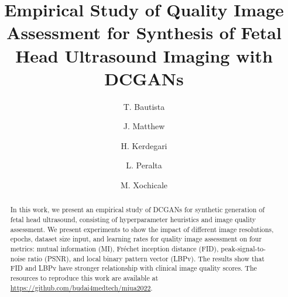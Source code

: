 \documentclass[runningheads]{llncs}
\begin{document}
\title{Empirical Study of Quality Image Assessment for Synthesis of Fetal Head Ultrasound Imaging with DCGANs}

\author{
T. Bautista \and %
J. Matthew \and %
H. Kerdegari \and %
L. Peralta \and %
M. Xochicale %
}

%
\maketitle              %

\begin{abstract}
In this work, we present an empirical study of DCGANs for synthetic generation of fetal head ultrasound, consisting of hyperparameter heuristics and image quality assessment.
We present experiments to show the impact of different image resolutions, epochs, dataset size input, and learning rates for quality image assessment on four metrics: mutual information (MI), Fr\'echet inception distance (FID), peak-signal-to-noise ratio (PSNR), and local binary pattern vector (LBPv). 
The results show that FID and LBPv have stronger relationship with clinical image quality scores.
The resources to reproduce this work are available at %
\url{https://github.com/budai4medtech/miua2022}.
\end{abstract}
\end{document}
